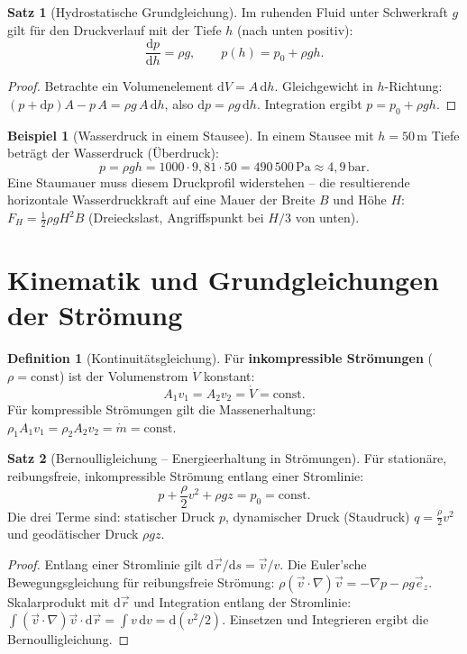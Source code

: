 ﻿\documentclass[a4paper,12pt]{report}
\theoremstyle{definition}
\newtheorem{definition}{Definition}
\newtheorem{beispiel}{Beispiel}
\newtheorem{satz}{Satz}
\begin{document}
\begin{satz}[Hydrostatische Grundgleichung]
Im ruhenden Fluid unter Schwerkraft $g$ gilt f\"ur den Druckverlauf
mit der Tiefe $h$ (nach unten positiv):
\[
  \frac{\mathrm{d}p}{\mathrm{d}h} = \rho g, \qquad p(h) = p_0 + \rho g h.
\]
\end{satz}
\begin{proof}
Betrachte ein Volumenelement $\mathrm{d}V = A\,\mathrm{d}h$.
Gleichgewicht in $h$-Richtung: $(p + \mathrm{d}p)A - p\,A = \rho g\,A\,\mathrm{d}h$,
also $\mathrm{d}p = \rho g\,\mathrm{d}h$. Integration ergibt $p = p_0 + \rho g h$.
\end{proof}

\begin{beispiel}[Wasserdruck in einem Stausee]
In einem Stausee mit $h = 50\,\mathrm{m}$ Tiefe betr\"agt der Wasserdruck
(\"Uberdruck):
\[
  p = \rho g h = 1000\cdot9{,}81\cdot50 = 490\,500\,\mathrm{Pa} \approx 4{,}9\,\mathrm{bar}.
\]
Eine Staumauer muss diesem Druckprofil widerstehen -- die resultierende
horizontale Wasserdruckkraft auf eine Mauer der Breite $B$ und H\"ohe $H$:
$F_H = \tfrac{1}{2}\rho g H^2 B$ (Dreieckslast, Angriffspunkt bei $H/3$ von unten).
\end{beispiel}

\section{Kinematik und Grundgleichungen der Str\"omung}

\begin{definition}[Kontinuit\"atsgleichung]
F\"ur \textbf{inkompressible Str\"omungen} ($\rho = \mathrm{const}$)
ist der Volumenstrom $\dot{V}$ konstant:
\[
  A_1 v_1 = A_2 v_2 = \dot{V} = \mathrm{const}.
\]
F\"ur kompressible Str\"omungen gilt die Massenerhaltung:
$\rho_1 A_1 v_1 = \rho_2 A_2 v_2 = \dot{m} = \mathrm{const}$.
\end{definition}

\begin{satz}[Bernoulligleichung -- Energieerhaltung in Str\"omungen]
F\"ur station\"are, reibungsfreie, inkompressible Str\"omung
entlang einer Stromlinie:
\[
  p + \frac{\rho}{2}v^2 + \rho g z = p_0 = \mathrm{const}.
\]
Die drei Terme sind: statischer Druck $p$, dynamischer Druck (Staudruck)
$q = \frac{\rho}{2}v^2$ und geodätischer Druck $\rho g z$.
\end{satz}
\begin{proof}
Entlang einer Stromlinie gilt $\mathrm{d}\vec{r}/\mathrm{d}s = \vec{v}/v$.
Die Euler'sche Bewegungsgleichung f\"ur reibungsfreie Str\"omung:
$\rho(\vec{v}\cdot\nabla)\vec{v} = -\nabla p - \rho g\vec{e}_z$.
Skalarprodukt mit $\mathrm{d}\vec{r}$ und Integration entlang der Stromlinie:
$\int(\vec{v}\cdot\nabla)\vec{v}\cdot\mathrm{d}\vec{r} = \int v\,\mathrm{d}v = \mathrm{d}(v^2/2)$.
Einsetzen und Integrieren ergibt die Bernoulligleichung.
\end{proof}
\end{document}
